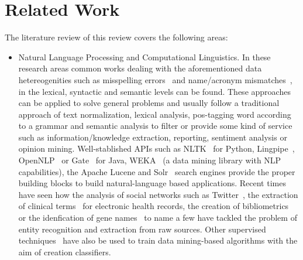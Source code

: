 \documentclass{llncs}
\begin{document}
\section{Related Work}
The literature review of this review covers the following areas:
\begin{itemize}
 \item Natural Language Processing and Computational Linguistics. In these research areas common works dealing with the aforementioned data hetereogenities 
   such as misspelling errors~\cite{NorvigSpelling,StanfordSpelling} and name/acronym mismatches~\cite{Yeates99automaticextraction,Ratinov:2004:AES:1025132.1026366}, 
  in the lexical, syntactic and semantic levels can be found. These approaches can be applied to solve general problems and usually follow a 
  traditional approach of text normalization, lexical analysis, pos-tagging word according to a grammar and semantic analysis to filter or 
  provide some kind of service such as information/knowledge extraction, reporting, sentiment analysis or opinion mining. 
  Well-stablished APIs such as NLTK~\cite{LoperBird02} for Python, Lingpipe~\cite{Lingpipe}, OpenNLP~\cite{OpenNLP} or Gate~\cite{Gate} for Java, WEKA~\cite{read12:_scalab} 
  (a data mining library with NLP capabilities), the Apache Lucene and Solr~\cite{rafa2011apache} search engines provide the proper building blocks to build natural-language based applications. 
  Recent times have seen how the analysis of social networks such as Twitter~\cite{Li:2012:TNE:2348283.2348380,Gimpel:2011:PTT:2002736.2002747}, the extraction of 
  clinical terms~\cite{Wang:2009:ARN:1667884.1667888} for electronic health records, the creation of bibliometrics~\cite{Galvez2006,Morillo:2013:TAA:2424697.2424727} or 
  the idenfication of gene names~\cite{Krauthammer:2004:TIB:1053007.1053018,Galvez2012} to name a few have tackled the problem of entity recognition and extraction from raw sources. 
  Other supervised techniques~\cite{Bohn:2006:PHD} have also be used to train data mining-based algorithms with the aim of creation classifiers.
 

\end{itemize}
\end{document}

